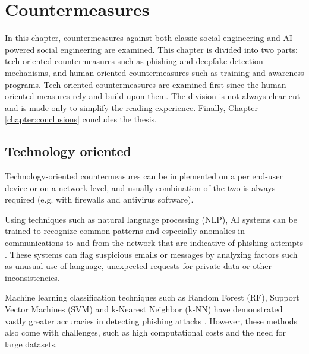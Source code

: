 



\chapter{Countermeasures\label{chapter:countermeasures}}

\begin{comment}


\end{comment}

In this chapter, countermeasures against both classic social engineering and AI-powered social engineering are examined. This chapter is divided into two parts: tech-oriented countermeasures such as phishing and deepfake detection mechanisms, and human-oriented countermeasures such as training and awareness programs. Tech-oriented countermeasures are examined first since the human-oriented measures rely and build upon them. The division is not always clear cut and is made only to simplify the reading experience. Finally, Chapter \ref{chapter:conclusions} concludes the thesis.


\section{Technology oriented}

\begin{comment}    
    - Deepfake content detection
    - Spear phishing detection
\end{comment}

Technology-oriented countermeasures can be implemented on a per end-user device or on a network level, and usually combination of the two is always required (e.g. with firewalls and antivirus software).

Using techniques such as natural language processing (NLP), AI systems can be trained to recognize common patterns and especially anomalies in communications to and from the network that are indicative of phishing attempts \citep{basitComprehensiveSurveyAIenabledPhishingAttacks2021}. These systems can flag suspicious emails or messages by analyzing factors such as unusual use of language, unexpected requests for private data or other inconsistencies.

Machine learning classification techniques such as Random Forest (RF), Support Vector Machines (SVM) and k-Nearest Neighbor (k-NN) have demonstrated vastly greater accuracies in detecting phishing attacks \citep{basitComprehensiveSurveyAIenabledPhishingAttacks2021}. However, these methods also come with challenges, such as high computational costs and the need for large datasets.

